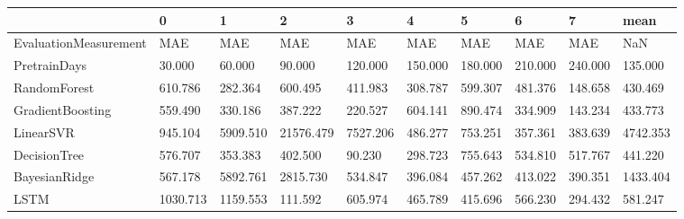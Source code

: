 \begin{tabular}{llllllllll}
\toprule
{} &        0 &        1 &         2 &        3 &       4 &       5 &       6 &       7 &     mean \\
\midrule
EvaluationMeasurement &      MAE &      MAE &       MAE &      MAE &     MAE &     MAE &     MAE &     MAE &      NaN \\
PretrainDays          &   30.000 &   60.000 &    90.000 &  120.000 & 150.000 & 180.000 & 210.000 & 240.000 &  135.000 \\
RandomForest          &  610.786 &  282.364 &   600.495 &  411.983 & 308.787 & 599.307 & 481.376 & 148.658 &  430.469 \\
GradientBoosting      &  559.490 &  330.186 &   387.222 &  220.527 & 604.141 & 890.474 & 334.909 & 143.234 &  433.773 \\
LinearSVR             &  945.104 & 5909.510 & 21576.479 & 7527.206 & 486.277 & 753.251 & 357.361 & 383.639 & 4742.353 \\
DecisionTree          &  576.707 &  353.383 &   402.500 &   90.230 & 298.723 & 755.643 & 534.810 & 517.767 &  441.220 \\
BayesianRidge         &  567.178 & 5892.761 &  2815.730 &  534.847 & 396.084 & 457.262 & 413.022 & 390.351 & 1433.404 \\
LSTM                  & 1030.713 & 1159.553 &   111.592 &  605.974 & 465.789 & 415.696 & 566.230 & 294.432 &  581.247 \\
\bottomrule
\end{tabular}
